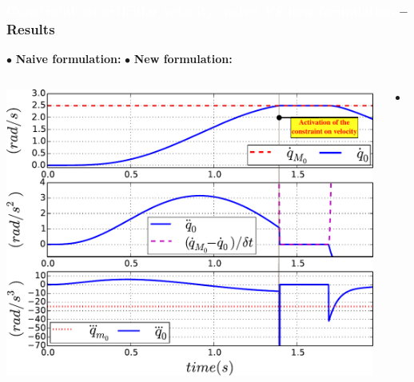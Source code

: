 \begin{frame}
\frametitle{{\textcolor{white}{Constraint on articular velocity: naive \textit{VS} new formulation} -- Results}}
$\bullet$ \textbf{Naive formulation:} \hspace{27mm} $\bullet$ {\color{blue}\textbf{New formulation:}}
\begin{columns}
\vspace{2mm}

{\includegraphics[width=0.91\columnwidth]{figures/0_Vel_constr_classic}} 


\begin{itemize}
\addtolength{\itemindent}{-1mm}
\item[\hookrightarrow] 
\end{itemize}



\vspace{-10mm}

\end{columns}
\end{frame}













